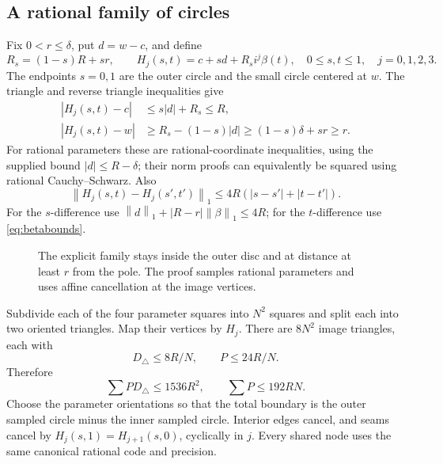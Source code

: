 \documentclass[11pt]{article}
\theoremstyle{definition}
\newcommand{\norm}[1]{\left\lVert#1\right\rVert_1}
\begin{document}
\subsection{A rational family of circles}

Fix \(0<r\le\delta\), put \(d=w-c\), and define
\[
 R_s=(1-s)R+sr,\qquad
 H_j(s,t)=c+sd+R_si^j\beta(t),\quad
 0\le s,t\le1,\quad j=0,1,2,3.
\]
The endpoints \(s=0,1\) are the outer circle and the small circle centered
at \(w\). The triangle and reverse triangle inequalities give
\begin{align}
 |H_j(s,t)-c|&\le s|d|+R_s\le R,\label{eq:homoin}\\
 |H_j(s,t)-w|&\ge R_s-(1-s)|d|
                 \ge(1-s)\delta+sr\ge r.\label{eq:homosep}
\end{align}
For rational parameters these are rational-coordinate inequalities, using
the supplied bound \(|d|\le R-\delta\); their norm proofs can equivalently
be squared using rational Cauchy--Schwarz. Also
\begin{equation}\label{eq:Hlip}
 \norm{H_j(s,t)-H_j(s',t')}
              \le4R(|s-s'|+|t-t'|).
\end{equation}
For the \(s\)-difference use
\(\norm d+|R-r|\norm\beta\le4R\); for the \(t\)-difference use
\eqref{eq:betabounds}.

\begin{figure}[ht]
\centering
{}
\caption{The explicit family stays inside the outer disc and at distance
at least \(r\) from the pole. The proof samples rational parameters and
uses affine cancellation at the image vertices.}
\label{fig:homotopy}
\end{figure}

Subdivide each of the four parameter squares into \(N^2\) squares and
split each into two oriented triangles. Map their vertices by \(H_j\).
There are \(8N^2\) image triangles, each with
\[
 D_\triangle\le8R/N,\qquad P\le24R/N.
\]
Therefore
\begin{equation}\label{eq:chainconstants}
 \sum PD_\triangle\le1536R^2,\qquad \sum P\le192RN.
\end{equation}
Choose the parameter orientations so that the total boundary is the outer
sampled circle minus the inner sampled circle. Interior edges cancel,
and seams cancel by \(H_j(s,1)=H_{j+1}(s,0)\), cyclically in \(j\).
Every shared node uses the same canonical rational code and precision.
\end{document}
